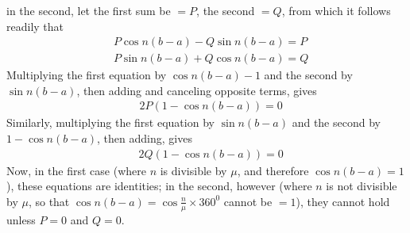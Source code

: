 in the second, let the first sum be \(=P\), the second \(=Q\), from which it follows readily that
\[
\begin{aligned}
&P\cos n(b-a)-Q\sin n(b-a)=P\\[5pt]
&P\sin n(b-a)+Q\cos n(b-a)=Q
\end{aligned}
\]
Multiplying the first equation by \(\cos n(b-a)-1\) and the second by \(\sin n(b-a)\),
then adding and canceling opposite terms, gives
\[
\begin{aligned}
&2P(1-\cos n(b-a))=0
\end{aligned}
\]
Similarly, multiplying the first equation by \(\sin n(b-a)\) and the second by
\(1-\cos n(b-a)\), then adding, gives
\[
\begin{aligned}
&2Q(1-\cos n(b-a))=0
\end{aligned}
\]
Now, in the first case (where \(n\) is divisible by \(\mu\), and therefore \(\cos n(b-a)=1\)),
these equations are identities; in the second, however (where \(n\) is not divisible by \(\mu\), so that \(\cos n(b-a)=\cos\frac{n}{\mu}\times360^{0}\) cannot be \(=1\)), they cannot hold unless \(P=0\) and \(Q=0\).

